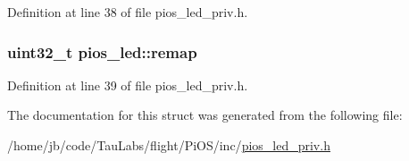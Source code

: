 \-Definition at line 38 of file pios\-\_\-led\-\_\-priv.\-h.

\hypertarget{structpios__led_ab372d17fd1c41d5366ac92b402773710}{
\subsubsection[{remap}]{\setlength{\rightskip}{0pt plus 5cm}uint32\-\_\-t {\bf pios\-\_\-led\-::remap}}}\label{structpios__led_ab372d17fd1c41d5366ac92b402773710}


\-Definition at line 39 of file pios\-\_\-led\-\_\-priv.\-h.



\-The documentation for this struct was generated from the following file\-:\begin{DoxyCompactItemize}
\item 
/home/jb/code/\-Tau\-Labs/flight/\-Pi\-O\-S/inc/\hyperlink{pios__led__priv_8h}{pios\-\_\-led\-\_\-priv.\-h}\end{DoxyCompactItemize}
